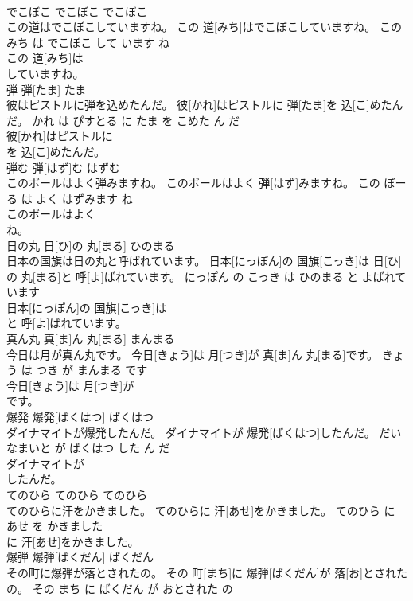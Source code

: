 \documentclass[8pt]{extreport}
\begin{document}
\begin{CJK}{UTF8}{min}
\\	でこぼこ	でこぼこ	でこぼこ	
\\	この道はでこぼこしていますね。	この 道[みち]はでこぼこしていますね。	この みち は でこぼこ して います ね	
\\	この 道[みち]は
\\	していますね。			
\\	弾	弾[たま]	たま	
\\	彼はピストルに弾を込めたんだ。	彼[かれ]はピストルに 弾[たま]を 込[こ]めたんだ。	かれ は ぴすとる に たま を こめた ん だ	
\\	彼[かれ]はピストルに
\\	を 込[こ]めたんだ。			
\\	弾む	弾[はず]む	はずむ	
\\	このボールはよく弾みますね。	このボールはよく 弾[はず]みますね。	この ぼーる は よく はずみます ね	
\\	このボールはよく
\\	ね。			
\\	日の丸	日[ひ]の 丸[まる]	ひのまる	
\\	日本の国旗は日の丸と呼ばれています。	日本[にっぽん]の 国旗[こっき]は 日[ひ]の 丸[まる]と 呼[よ]ばれています。	にっぽん の こっき は ひのまる と よばれて います	
\\	日本[にっぽん]の 国旗[こっき]は
\\	と 呼[よ]ばれています。			
\\	真ん丸	真[ま]ん 丸[まる]	まんまる	
\\	今日は月が真ん丸です。	今日[きょう]は 月[つき]が 真[ま]ん 丸[まる]です。	きょう は つき が まんまる です	
\\	今日[きょう]は 月[つき]が
\\	です。			
\\	爆発	爆発[ばくはつ]	ばくはつ	
\\	ダイナマイトが爆発したんだ。	ダイナマイトが 爆発[ばくはつ]したんだ。	だいなまいと が ばくはつ した ん だ	
\\	ダイナマイトが
\\	したんだ。			
\\	てのひら	てのひら	てのひら	
\\	てのひらに汗をかきました。	てのひらに 汗[あせ]をかきました。	てのひら に あせ を かきました	
\\	に 汗[あせ]をかきました。			
\\	爆弾	爆弾[ばくだん]	ばくだん	
\\	その町に爆弾が落とされたの。	その 町[まち]に 爆弾[ばくだん]が 落[お]とされたの。	その まち に ばくだん が おとされた の	

\end{CJK}
\end{document}

